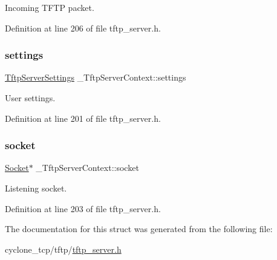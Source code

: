 Incoming T\+F\+TP packet. 



Definition at line 206 of file tftp\+\_\+server.\+h.

\mbox{\label{struct__TftpServerContext_adaf2a9a72bc906e3d18fa724566555b6}} 
\subsubsection{\texorpdfstring{settings}{settings}}
{\footnotesize\ttfamily \hyperlink{structTftpServerSettings}{Tftp\+Server\+Settings} \+\_\+\+Tftp\+Server\+Context\+::settings}



User settings. 



Definition at line 201 of file tftp\+\_\+server.\+h.

\mbox{\label{struct__TftpServerContext_a22ca610eecff8811985a003459e9c055}} 
\subsubsection{\texorpdfstring{socket}{socket}}
{\footnotesize\ttfamily \hyperlink{socket_8h_aa85acfb0fa336ef495e6ba87fb88fc48}{Socket}$\ast$ \+\_\+\+Tftp\+Server\+Context\+::socket}



Listening socket. 



Definition at line 203 of file tftp\+\_\+server.\+h.



The documentation for this struct was generated from the following file\+:\begin{DoxyCompactItemize}
\item 
cyclone\+\_\+tcp/tftp/\hyperlink{tftp__server_8h}{tftp\+\_\+server.\+h}\end{DoxyCompactItemize}
